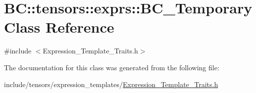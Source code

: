 \hypertarget{classBC_1_1tensors_1_1exprs_1_1BC__Temporary}{}\section{BC\+:\+:tensors\+:\+:exprs\+:\+:B\+C\+\_\+\+Temporary Class Reference}
\label{classBC_1_1tensors_1_1exprs_1_1BC__Temporary}


{\ttfamily \#include $<$Expression\+\_\+\+Template\+\_\+\+Traits.\+h$>$}



The documentation for this class was generated from the following file\+:\begin{DoxyCompactItemize}
\item 
include/tensors/expression\+\_\+templates/\hyperlink{Expression__Template__Traits_8h}{Expression\+\_\+\+Template\+\_\+\+Traits.\+h}\end{DoxyCompactItemize}
